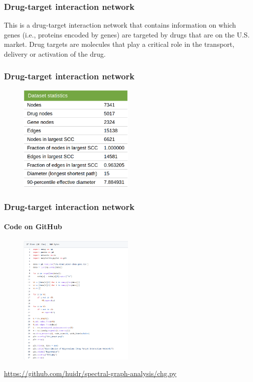 \documentclass[aspectratio=43,leqno]{beamer}
\begin{document}
\begin{frame}
  \frametitle{Drug-target interaction network}
  
This is a drug-target interaction network that contains information on which genes (i.e., proteins encoded by genes) are targeted by drugs that are on the U.S. market. Drug targets are molecules that play a critical role in the transport, delivery or activation of the drug. 

\end{frame}

\begin{frame}
  \frametitle{Drug-target interaction network}
  
    \begin{figure}[h]
    \centering
    \includegraphics[width=0.5\textwidth]{images/chg.png}
    \label{fig:mesh1}
  \end{figure}
  
\end{frame}

\begin{frame}
    \frametitle{Drug-target interaction network}
  \framesubtitle{Code on GitHub}

 \begin{figure}[h]
    \centering
    \includegraphics[width=0.5\textwidth]{images/chg-code.png}
    \label{fig:mesh1}
  \end{figure}
  \hyperref{https://github.com/huidr/spectral-graph-analysis/tfg.py}{}{}{https://github.com/huidr/spectral-graph-analysis/chg.py}
  
\end{frame}
\end{document}
